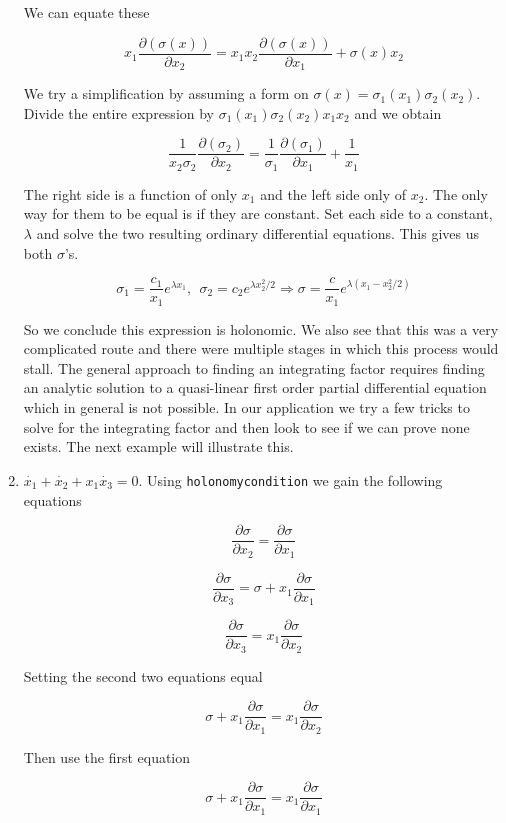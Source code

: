 \begin{enumerate}
  We can equate these

  \[x_1\frac{\partial (\sigma (x))}{\partial x_2} = x_1 x_2\frac{\partial (\sigma (x))}{\partial x_1} + \sigma(x) x_2\]

  We try a simplification by assuming a form on
  \(\sigma(x) = \sigma_1(x_1)\sigma_2(x_2)\). Divide the entire
  expression by \(\sigma_1(x_1)\sigma_2(x_2)x_1x_2\) and we obtain

  \[\frac{1}{x_2 \sigma_2}\frac{\partial (\sigma_2 )}{\partial x_2} = \frac{1}{\sigma_1}\frac{\partial (\sigma_1)}{\partial x_1} + \frac{1}{x_1}\]

  The right side is a function of only \(x_1\) and the left side only of
  \(x_2\). The only way for them to be equal is if they are constant.
  Set each side to a constant, \(\lambda\) and solve the two resulting
  ordinary differential equations. This gives us both \(\sigma\)'s.

  \[\sigma_1 = \frac{c_1}{x_1}e^{\lambda x_1} , ~~ \sigma_2 = c_2 e^{\lambda x_2^2/2}
  \Rightarrow  \sigma = \frac{c}{x_1}e^{\lambda (x_1 - x_2^2/2)}\]

  So we conclude this expression is holonomic. We also see that this was
  a very complicated route and there were multiple stages in which this
  process would stall. The general approach to finding an integrating
  factor requires finding an analytic solution to a quasi-linear first
  order partial differential equation which in general is not possible.
  In our application we try a few tricks to solve for the integrating
  factor and then look to see if we can prove none exists. The next
  example will illustrate this.
\item
  \(\dot{x_1} + \dot{x_2} + x_1\dot{x_3} = 0\). Using
  \texttt{holonomycondition} we gain the following equations

  \[\frac{\partial \sigma}{\partial x_2} = \frac{\partial \sigma}{\partial x_1}\]

  \[\frac{\partial \sigma}{\partial x_3} = \sigma + x_1\frac{\partial \sigma}{\partial x_1}\]

  \[\frac{\partial \sigma}{\partial x_3} = x_1\frac{\partial \sigma}{\partial x_2}\]

  Setting the second two equations equal

  \[\sigma + x_1\frac{\partial \sigma}{\partial x_1} = x_1\frac{\partial \sigma}{\partial x_2}\]

  Then use the first equation

  \[\sigma + x_1\frac{\partial \sigma}{\partial x_1} = x_1\frac{\partial \sigma}{\partial x_1}\]


\end{enumerate}
